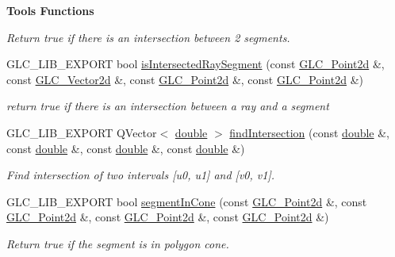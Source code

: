 \begin{Indent}{\bf Tools Functions}
\begin{DoxyCompactItemize}
\begin{DoxyCompactList}\small\item\em Return true if there is an intersection between 2 segments. \end{DoxyCompactList}\item 
G\-L\-C\-\_\-\-L\-I\-B\-\_\-\-E\-X\-P\-O\-R\-T bool \hyperlink{namespaceglc_a56b1297badfff023142a6606fb2bf091}{is\-Intersected\-Ray\-Segment} (const \hyperlink{glc__vector2d_8h_aa2ff653e68023d8ac19c421c53fd764a}{G\-L\-C\-\_\-\-Point2d} \&, const \hyperlink{class_g_l_c___vector2d}{G\-L\-C\-\_\-\-Vector2d} \&, const \hyperlink{glc__vector2d_8h_aa2ff653e68023d8ac19c421c53fd764a}{G\-L\-C\-\_\-\-Point2d} \&, const \hyperlink{glc__vector2d_8h_aa2ff653e68023d8ac19c421c53fd764a}{G\-L\-C\-\_\-\-Point2d} \&)
\begin{DoxyCompactList}\small\item\em return true if there is an intersection between a ray and a segment \end{DoxyCompactList}\item 
G\-L\-C\-\_\-\-L\-I\-B\-\_\-\-E\-X\-P\-O\-R\-T Q\-Vector$<$ \hyperlink{_super_l_u_support_8h_a8956b2b9f49bf918deed98379d159ca7}{double} $>$ \hyperlink{namespaceglc_ae04a0015cdab6303c023e2d93ab71f55}{find\-Intersection} (const \hyperlink{_super_l_u_support_8h_a8956b2b9f49bf918deed98379d159ca7}{double} \&, const \hyperlink{_super_l_u_support_8h_a8956b2b9f49bf918deed98379d159ca7}{double} \&, const \hyperlink{_super_l_u_support_8h_a8956b2b9f49bf918deed98379d159ca7}{double} \&, const \hyperlink{_super_l_u_support_8h_a8956b2b9f49bf918deed98379d159ca7}{double} \&)
\begin{DoxyCompactList}\small\item\em Find intersection of two intervals \mbox{[}u0, u1\mbox{]} and \mbox{[}v0, v1\mbox{]}. \end{DoxyCompactList}\item 
G\-L\-C\-\_\-\-L\-I\-B\-\_\-\-E\-X\-P\-O\-R\-T bool \hyperlink{namespaceglc_ae25d2a5e89cc7f6ad4083663aee6728e}{segment\-In\-Cone} (const \hyperlink{glc__vector2d_8h_aa2ff653e68023d8ac19c421c53fd764a}{G\-L\-C\-\_\-\-Point2d} \&, const \hyperlink{glc__vector2d_8h_aa2ff653e68023d8ac19c421c53fd764a}{G\-L\-C\-\_\-\-Point2d} \&, const \hyperlink{glc__vector2d_8h_aa2ff653e68023d8ac19c421c53fd764a}{G\-L\-C\-\_\-\-Point2d} \&, const \hyperlink{glc__vector2d_8h_aa2ff653e68023d8ac19c421c53fd764a}{G\-L\-C\-\_\-\-Point2d} \&)
\begin{DoxyCompactList}\small\item\em Return true if the segment is in polygon cone. \end{DoxyCompactList}\item 

\end{DoxyCompactItemize}
\end{Indent}
